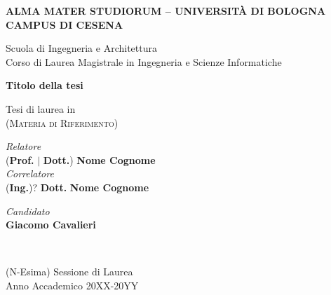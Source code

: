 \begin{titlepage}
	\begin{center}
		\large
		\textbf{ALMA MATER STUDIORUM -- UNIVERSITÀ DI BOLOGNA \\ CAMPUS DI CESENA}
		\\
		\noindent\hrulefill
		\vspace{0.4cm}

		\Large
		Scuola di Ingegneria e Architettura \\
		Corso di Laurea Magistrale in Ingegneria e Scienze Informatiche

		\Huge
		\vspace{4cm}
		\textbf{
			Titolo della tesi
		}

		\large
		\vspace{1cm}
		Tesi di laurea in
		\\
		\textsc{(Materia di Riferimento)}

		\vspace{5.5cm}
		\begin{minipage}[t]{0.64\textwidth}
			\begin{flushleft}
				\textit{Relatore}
				\\
				(\textbf{Prof.} $\mid$ \textbf{Dott.}) \textbf{Nome Cognome}
				\\
				\vspace{0.4cm}
				\textit{Correlatore}
				\\
				(\textbf{Ing.})? \textbf{Dott.} \textbf{Nome Cognome}
			\end{flushleft}
		\end{minipage}
		\begin{minipage}[t]{0.34\textwidth}
			\begin{flushright}
				\textit{Candidato}
				\\
				\textbf{Giacomo Cavalieri}
			\end{flushright}
		\end{minipage}\\

		\vfill
		\noindent\hrulefill
		\vspace{0.3cm}
		\Large

		(N-Esima) Sessione di Laurea
		\\
		Anno Accademico 20XX-20YY
	\end{center}
\end{titlepage}
\restoregeometry